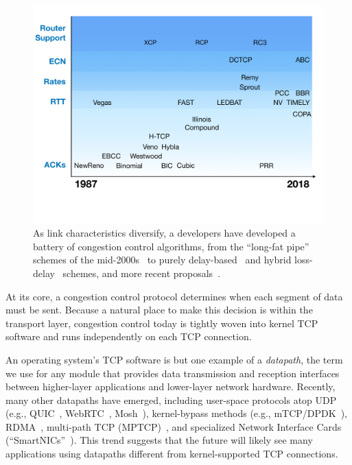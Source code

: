 \begin{figure}[t]
\centering
    \includegraphics[width=\columnwidth]{img/cc-timeline}
    \vspace{-1cm}
    \caption{As link characteristics diversify, a developers have developed a battery of congestion control algorithms, from the ``long-fat pipe'' schemes of the mid-2000s~\cite{westwood, veno, htcp, hybla} to purely delay-based~\cite{vegas, fasttcp, ledbat, nv, timely} and hybrid loss-delay~\cite{illinois, compound} schemes, and more recent proposals~\cite{pcc, remy, sprout, bbr, copa, abc}.}\label{fig:cctimeline}
\end{figure}

At its core, a congestion control protocol determines when each segment of data must be sent. Because a natural place to make this decision is within the transport layer, congestion control today is tightly woven into kernel TCP software and runs independently on each TCP connection.

An operating system's TCP software is but one example of a {\em datapath}, the term we use for any module that provides data transmission and reception interfaces between higher-layer applications and lower-layer network hardware. Recently, many other datapaths have emerged, including user-space protocols atop UDP (e.g., QUIC~\cite{quic}, WebRTC~\cite{webrtc}, Mosh~\cite{mosh}), kernel-bypass methods (e.g., mTCP/DPDK~\cite{dpdk,mtcp,netmap}), RDMA~\cite{dcqcn}, multi-path TCP (MPTCP)~\cite{mptcp}, and specialized Network Interface Cards (``SmartNICs''~\cite{smartnic}). This trend suggests that the future will likely see many applications using datapaths different from kernel-supported TCP connections.

